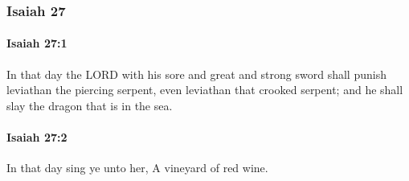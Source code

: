 	\subsubsection{Isaiah 27} %
		\label{ISAIAH-27}

		\paragraph{Isaiah 27:1} %
			\label{ISAIAH-27-1}

			In that day the LORD with his sore and great and strong sword shall punish leviathan the piercing serpent, even leviathan that crooked serpent; and he shall slay the dragon that is in the sea.


		\paragraph{Isaiah 27:2} %
			\label{ISAIAH-27-2}

			In that day sing ye unto her, A vineyard of red wine.

